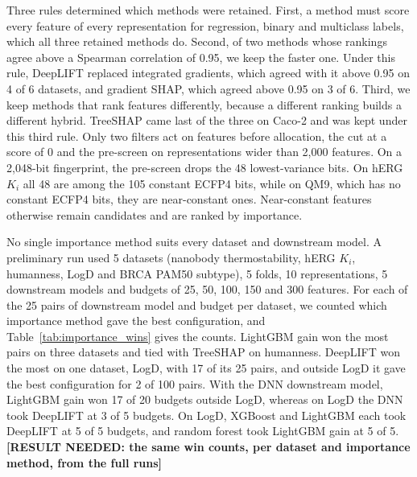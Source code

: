 Three rules determined which methods were retained. First, a method must score every feature of every representation for regression, binary and multiclass labels, which all three retained methods do. Second, of two methods whose rankings agree above a Spearman correlation of 0.95, we keep the faster one. Under this rule, DeepLIFT replaced integrated gradients, which agreed with it above 0.95 on 4 of 6 datasets, and gradient SHAP, which agreed above 0.95 on 3 of 6. Third, we keep methods that rank features differently, because a different ranking builds a different hybrid. TreeSHAP came last of the three on Caco-2 and was kept under this third rule. Only two filters act on features before allocation, the cut at a score of 0 and the pre-screen on representations wider than 2,000 features. On a 2,048-bit fingerprint, the pre-screen drops the 48 lowest-variance bits. On hERG $K_i$ all 48 are among the 105 constant ECFP4 bits, while on QM9, which has no constant ECFP4 bits, they are near-constant ones. Near-constant features otherwise remain candidates and are ranked by importance.

No single importance method suits every dataset and downstream model. A preliminary run used 5 datasets (nanobody thermostability, hERG $K_i$, humanness, LogD and BRCA PAM50 subtype), 5 folds, 10 representations, 5 downstream models and budgets of 25, 50, 100, 150 and 300 features. For each of the 25 pairs of downstream model and budget per dataset, we counted which importance method gave the best configuration, and Table~\ref{tab:importance_wins} gives the counts. LightGBM gain won the most pairs on three datasets and tied with TreeSHAP on humanness. DeepLIFT won the most on one dataset, LogD, with 17 of its 25 pairs, and outside LogD it gave the best configuration for 2 of 100 pairs. With the DNN downstream model, LightGBM gain won 17 of 20 budgets outside LogD, whereas on LogD the DNN took DeepLIFT at 3 of 5 budgets. On LogD, XGBoost and LightGBM each took DeepLIFT at 5 of 5 budgets, and random forest took LightGBM gain at 5 of 5. \textbf{[RESULT NEEDED: the same win counts, per dataset and importance method, from the full runs]}

